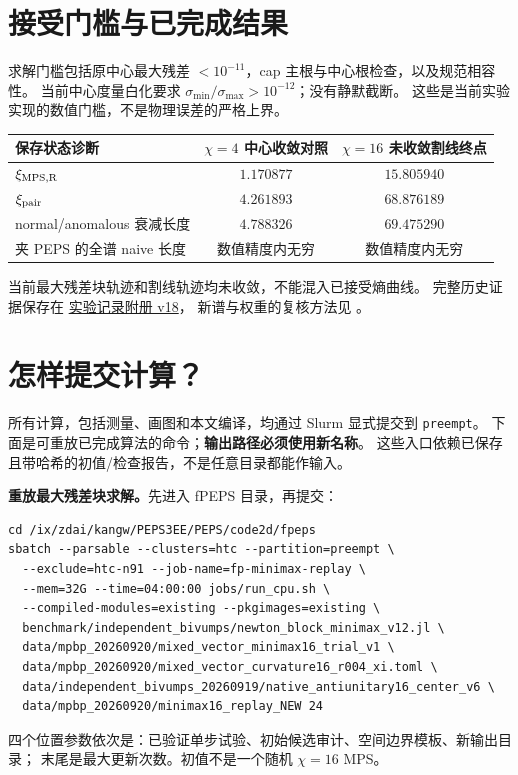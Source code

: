\documentclass[11pt]{article}
\begin{document}
\section{接受门槛与已完成结果}
求解门槛包括原中心最大残差 $<10^{-11}$，cap 主根与中心根检查，以及规范相容性。
当前中心度量白化要求 $\sigma_{\min}/\sigma_{\max}>10^{-12}$；没有静默截断。
这些是当前实验实现的数值门槛，不是物理误差的严格上界。

\begin{center}\small
\begin{tabular}{lcc}
\toprule
保存状态诊断 & $\chi=4$ 中心收敛对照 & $\chi=16$ 未收敛割线终点\\\midrule
$\xi_{\rm MPS,R}$ & $1.170877$ & $15.805940$\\
$\xi_{\rm pair}$ & $4.261893$ & $68.876189$\\
normal/anomalous 衰减长度 & $4.788326$ & $69.475290$\\
夹 PEPS 的全谱 naive 长度 & 数值精度内无穷 & 数值精度内无穷\\
\bottomrule
\end{tabular}
\end{center}
当前最大残差块轨迹和割线轨迹均未收敛，不能混入已接受熵曲线。
完整历史证据保存在 \href{appendix_experiments_v18.pdf}{实验记录附册 v18}，
新谱与权重的复核方法见
。
\clearpage

\section{怎样提交计算？}
所有计算，包括测量、画图和本文编译，均通过 Slurm 显式提交到 \texttt{preempt}。
下面是可重放已完成算法的命令；\textbf{输出路径必须使用新名称}。
这些入口依赖已保存且带哈希的初值/检查报告，不是任意目录都能作输入。

\textbf{重放最大残差块求解。}先进入 fPEPS 目录，再提交：
\begin{Verbatim}[fontsize=\scriptsize]
cd /ix/zdai/kangw/PEPS3EE/PEPS/code2d/fpeps
sbatch --parsable --clusters=htc --partition=preempt \
  --exclude=htc-n91 --job-name=fp-minimax-replay \
  --mem=32G --time=04:00:00 jobs/run_cpu.sh \
  --compiled-modules=existing --pkgimages=existing \
  benchmark/independent_bivumps/newton_block_minimax_v12.jl \
  data/mpbp_20260920/mixed_vector_minimax16_trial_v1 \
  data/mpbp_20260920/mixed_vector_curvature16_r004_xi.toml \
  data/independent_bivumps_20260919/native_antiunitary16_center_v6 \
  data/mpbp_20260920/minimax16_replay_NEW 24
\end{Verbatim}
四个位置参数依次是：已验证单步试验、初始候选审计、空间边界模板、新输出目录；
末尾是最大更新次数。初值不是一个随机 $\chi=16$ MPS。
\end{document}
